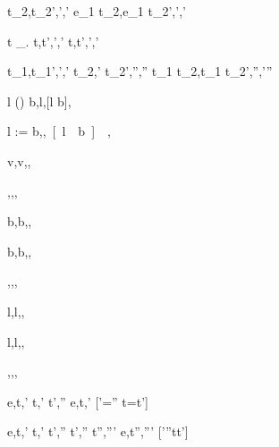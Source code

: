
	{t_2,\sigma \normalise t_2',\sigma',\delta'}
	{e_1 \Trans t_2,\sigma \normalise e_1 \Trans t_2',\sigma',\delta'}

	{t \Step \lambda\_. \Forever t,\sigma \normalise t',\sigma',\delta'}
	{\Forever t,\sigma \normalise t',\sigma',\delta'}

	{t_1,\sigma \normalise t_1',\sigma',\delta' \Quad
	 t_2,\sigma' \normalise t_2',\sigma'',\delta''}
	{t_1 \Pair t_2,\sigma \normalise t_1 \Pair t_2',\sigma'',\delta'\cup\delta''}




	{l \not\in {}(\sigma)}
	{\Share b,\sigma \normalise \Done l,[l \mapsto b]\sigma,\nothing}

	{}
	{l := b,\sigma \normalise \Done \unit,[l \mapsto b]\sigma,}



  { }
  {\Done v,\sigma \normalise \Done v,\sigma,\nothing}

  { }
  {\Enter \beta,\sigma \normalise \Enter \beta,\sigma,\nothing}

  { }
  {\Update b,\sigma \normalise \Update b,\sigma,\nothing}

  { }
  {\View b,\sigma \normalise \View b,\sigma,\nothing}

  { }
  {\Pick {},\sigma \normalise \Pick {},\sigma,\nothing}

  { }
  {\Change l,\sigma \normalise \Change l,\sigma,\nothing}

  { }
  {\Watch l,\sigma \normalise \Watch l,\sigma,\nothing}

  { }
  {\Fail,\sigma \normalise \Fail,\sigma,\nothing}






    {e,\sigma \eval t,\sigma' \Quad
     t,\sigma' \stride t',\sigma''}
    {e,\sigma \normalise t,\sigma'}
    [\sigma'=\sigma'' \land t=t']

    {e,\sigma \eval t,\sigma'  \Quad
     t,\sigma' \stride t',\sigma''  \Quad
     t',\sigma'' \normalise t'',\sigma'''}
    {e,\sigma \normalise t'',\sigma'''}
    [\sigma'\neq \sigma''\vee t\neq t']



